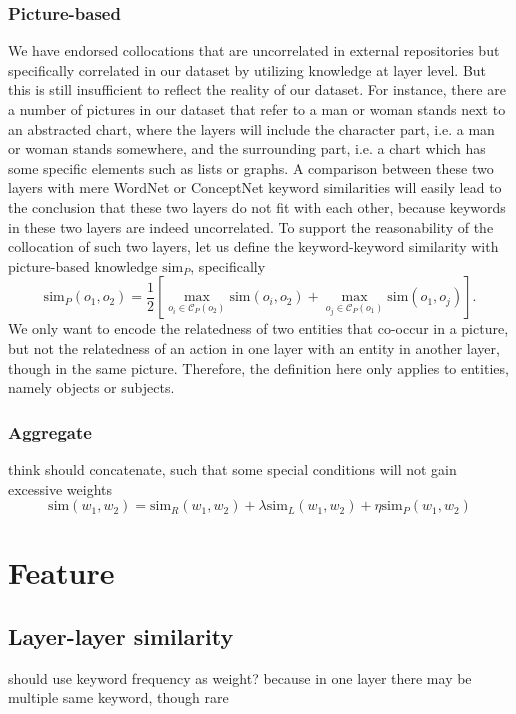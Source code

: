 \documentclass{article} %
\begin{document}
\subsubsection{Picture-based}
We have endorsed collocations that are uncorrelated in external repositories but specifically correlated in our dataset by utilizing knowledge at layer level. But this is still insufficient to reflect the reality of our dataset. For instance, there are a number of pictures in our dataset that refer to a man or woman stands next to an abstracted chart, where the layers will include the character part, i.e. a man or woman stands somewhere, and the surrounding part, i.e. a chart which has some specific elements such as lists or graphs. A comparison between these two layers with mere WordNet or ConceptNet keyword similarities will easily lead to the conclusion that these two layers do not fit with each other, because keywords in these two layers are indeed uncorrelated. To support the reasonability of the collocation of such two layers, let us define the keyword-keyword similarity with picture-based knowledge $\mathrm{sim}_P$, specifically
$$
\mathrm{sim}_P (o_1, o_2) =\frac{1}{2} \left[\max_{o_i\in \mathcal{C}_P(o_2)} \mathrm{sim} (o_i, o_2)+\max_{o_j\in \mathcal{C}_P(o_1)} \mathrm{sim} (o_1, o_j) \right].
$$
We only want to encode the relatedness of two entities that co-occur in a picture, but not the relatedness of an action in one layer with an entity in another layer, though in the same picture. Therefore, the definition here only applies to entities, namely objects or subjects. 


\subsubsection{Aggregate}
think should concatenate, such that some special conditions will not gain excessive weights
$$
\mathrm{sim}(w_1,w_2) = \mathrm{sim}_R(w_1,w_2) + \lambda \mathrm{sim}_L (w_1,w_2) + \eta \mathrm{sim}_P (w_1,w_2)
$$

\section{Feature}
\subsection{Layer-layer similarity}
should use keyword frequency as weight? because in one layer there may be multiple same keyword, though rare
\end{document}

